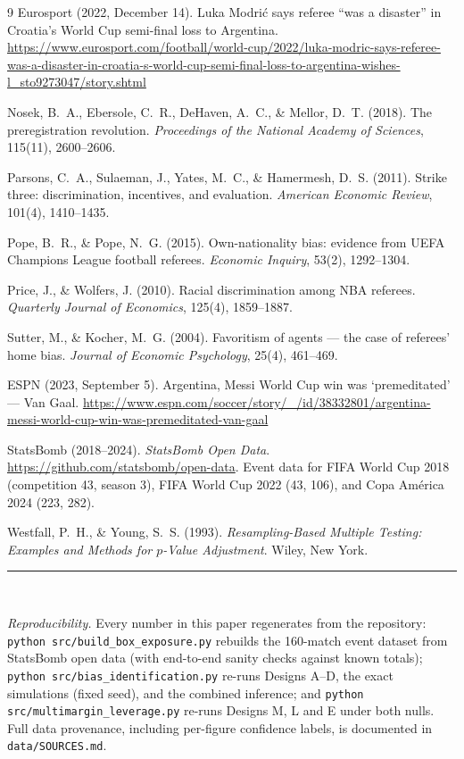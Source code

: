 \documentclass[11pt,a4paper]{article}
\begin{document}
\begin{thebibliography}{9}
Eurosport (2022, December 14).
Luka Modri\'c says referee ``was a disaster'' in Croatia's World Cup semi-final loss
to Argentina.
\url{https://www.eurosport.com/football/world-cup/2022/luka-modric-says-referee-was-a-disaster-in-croatia-s-world-cup-semi-final-loss-to-argentina-wishes-l_sto9273047/story.shtml}

Nosek, B.~A., Ebersole, C.~R., DeHaven, A.~C., \& Mellor, D.~T. (2018).
The preregistration revolution.
\emph{Proceedings of the National Academy of Sciences}, 115(11), 2600--2606.

Parsons, C.~A., Sulaeman, J., Yates, M.~C., \& Hamermesh, D.~S. (2011).
Strike three: discrimination, incentives, and evaluation.
\emph{American Economic Review}, 101(4), 1410--1435.

Pope, B.~R., \& Pope, N.~G. (2015).
Own-nationality bias: evidence from UEFA Champions League football referees.
\emph{Economic Inquiry}, 53(2), 1292--1304.

Price, J., \& Wolfers, J. (2010).
Racial discrimination among NBA referees.
\emph{Quarterly Journal of Economics}, 125(4), 1859--1887.

Sutter, M., \& Kocher, M.~G. (2004).
Favoritism of agents --- the case of referees' home bias.
\emph{Journal of Economic Psychology}, 25(4), 461--469.

ESPN (2023, September 5).
Argentina, Messi World Cup win was `premeditated' --- Van Gaal.
\url{https://www.espn.com/soccer/story/_/id/38332801/argentina-messi-world-cup-win-was-premeditated-van-gaal}

StatsBomb (2018--2024). \emph{StatsBomb Open Data}.
\url{https://github.com/statsbomb/open-data}.
Event data for FIFA World Cup 2018 (competition 43, season 3), FIFA World Cup 2022
(43, 106), and Copa Am\'erica 2024 (223, 282).

Westfall, P.~H., \& Young, S.~S. (1993).
\emph{Resampling-Based Multiple Testing: Examples and Methods for $p$-Value
Adjustment}. Wiley, New York.

\end{thebibliography}

\vspace{10pt}
\noindent\rule{\textwidth}{0.4pt}\\[4pt]
{\sloppy
\noindent\small\textit{Reproducibility.} Every number in this paper regenerates from
the repository: \texttt{python src/build\_box\_exposure.py} rebuilds the 160-match
event dataset from StatsBomb open data (with end-to-end sanity checks against known
totals); \texttt{python src/bias\_identification.py} re-runs Designs A--D, the exact
simulations (fixed seed), and the combined inference; and
\texttt{python src/multimargin\_leverage.py} re-runs Designs M, L and E under both
nulls. Full data provenance,
including per-figure confidence labels, is documented in \texttt{data/SOURCES.md}.\par}
\end{document}
